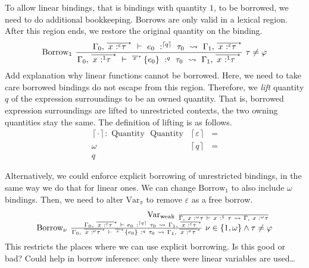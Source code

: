 To allow linear bindings, that is bindings with quantity \(1\), to be
borrowed, we need to do additional bookkeeping. Borrows are only valid
in a lexical region. After this region ends, we restore the original
quantity on the binding.
\[\text{Borrow}_{1}\ \frac{\text{\quad\quad}{\Gamma_{0}{,\ }{\overline{\,{x\text{ :}^{\varepsilon}\tau}\:}}^{\ast}\  \vdash \ e_{0}\ :^{\left\lceil q \right\rceil}\ \tau_{0}\  \rightsquigarrow \ \Gamma_{1}{,\ }{\overline{\,{x\text{ :}^{\varepsilon}\tau}\:}}^{\ast}}}{\Gamma_{0}{,\ }{\overline{\,{x\text{ :}^{1}\tau}\:}}^{\ast}\  \vdash \ {{}^{{\overline{\, x\:}}^{\ast}}\left\{ e_{0} \right\}}\ :^{q}\ \tau_{0}\  \rightsquigarrow \ \Gamma_{1}{,\ }{\overline{\,{x\text{ :}^{1}\tau}\:}}^{\ast}}\ \tau \neq \varphi\]
Add explanation why linear functions cannot be borrowed. Here, we need
to take care borrowed bindings do not escape from this region.
Therefore, we \emph{lift} quantity \(q\) of the expression surroundings
to be an owned quantity. That is, borrowed expression surroundings are
lifted to unrestricted contexts, the two owning quantities stay the
same. The definition of lifting is as follows. \[\begin{array}{lll}
{\left\lceil \cdot \right\rceil:\text{ Quantity }\text{ Quantity}} & \left\lceil \varepsilon \right\rceil & = \\
\omega & \left\lceil q \right\rceil & = \\
q
\end{array}\]

Alternatively, we could enforce explicit borrowing of unrestricted
bindings, in the same way we do that for linear ones. We can change
\(\text{Borrow}_{1}\) to also include \(\omega\) bindings. Then, we need
to alter \(\text{Var}_{\pi}\) to remove \(\varepsilon\) as a free
borrow. \[\begin{array}{r}
{\text{Var}_{\text{weak}}\ \frac{\text{\quad\quad}\ }{\Gamma{,\ }{x\text{ :}^{\omega}\tau}\  \vdash \ x\ :^{1}\ \tau\  \rightsquigarrow \ \Gamma{,\ }{x\text{ :}^{\omega}\tau}}\ } \\
{\text{Borrow}_{\nu}\ \frac{\text{\quad\quad}{\Gamma_{0}{,\ }{\overline{\,{x\text{ :}^{\varepsilon}\tau}\:}}^{\ast}\  \vdash \ e_{0}\ :^{\left\lceil q \right\rceil}\ \tau_{0}\  \rightsquigarrow \ \Gamma_{1}{,\ }{\overline{\,{x\text{ :}^{\varepsilon}\tau}\:}}^{\ast}}}{\Gamma_{0}{,\ }{\overline{\,{x\text{ :}^{\nu}\tau}\:}}^{\ast}\  \vdash \ {{}^{{\overline{\, x\:}}^{\ast}}\left\{ e_{0} \right\}}\ :^{q}\ \tau_{0}\  \rightsquigarrow \ \Gamma_{1}{,\ }{\overline{\,{x\text{ :}^{\nu}\tau}\:}}^{\ast}}\ \nu \in \left\{ 1,\omega \right\} \land \tau \neq \varphi}
\end{array}\] This restricts the places where we can use explicit
borrowing. Is this good or bad? Could help in borrow inference: only
there were linear variables are used\ldots{}

